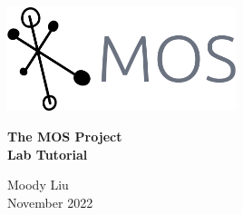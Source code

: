 \documentclass{report}
\begin{document}
\begin{titlepage}
    \vspace*{5cm}
    \begin{center}
        \includegraphics[width=0.5\textwidth]{logo-no-background.png}
    \end{center}

    \vspace{1cm}

    \begin{center}
        \textbf{\huge The MOS Project}\\
        \vspace{0.5cm}
        \textbf{\large Lab Tutorial}

        \vspace{5cm}
        Moody Liu\\
        November 2022
    \end{center}
\end{titlepage}

\tableofcontents



\end{document}
